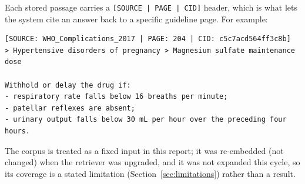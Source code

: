 Each stored passage carries a \texttt{[SOURCE | PAGE | CID]} header, which is
what lets the system cite an answer back to a specific guideline page. For
example:

\begin{lstlisting}[style=prompt]
[SOURCE: WHO_Complications_2017 | PAGE: 204 | CID: c5c7acd564ff3c8b]
> Hypertensive disorders of pregnancy > Magnesium sulfate maintenance dose

Withhold or delay the drug if:
- respiratory rate falls below 16 breaths per minute;
- patellar reflexes are absent;
- urinary output falls below 30 mL per hour over the preceding four hours.
\end{lstlisting}

The corpus is treated as a fixed input in this report; it was re-embedded
(not changed) when the retriever was upgraded, and it was not expanded this
cycle, so its coverage is a stated limitation (Section~\ref{sec:limitations})
rather than a result.
